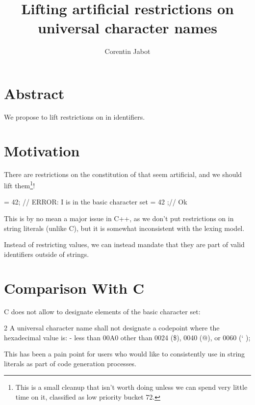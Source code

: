 \documentclass{wg21}
\title{Lifting artificial restrictions on universal character names}
\author{Corentin Jabot}{corentin.jabot@gmail.com}
\begin{document}
\maketitle

\section{Abstract}

We propose to lift restrictions on  in identifiers.

\section {Motivation}

There are restrictions on the constitution of  that seem artificial,
and we should lift them\footnote{This is a small cleanup that isn't worth doing unless we can spend very little time on it,
classified as low priority bucket 72.}!

\begin{colorblock}
 = 42; // ERROR: I is in the basic character set
 = 42 ;// Ok
\end{colorblock}

This is by no mean a major issue in C++, as we don't put restrictions on  in string literals (unlike C),
but it is somewhat inconsistent with the lexing model.

Instead of restricting  values,
we can instead mandate that they are part of valid identifiers outside of strings.

\section{Comparison With C}

C does not allow  to designate elements of the basic character set:

\begin{quoteblock}
2 A universal character name shall not designate a codepoint where the hexadecimal value is:
- less than 00A0 other than 0024 (\$), 0040 (@), or 0060 (` );
\end{quoteblock}

This has been a pain point for users who would like to consistently use  in string literals as
part of code generation processes.
\end{document}
